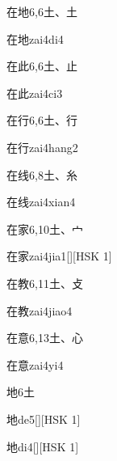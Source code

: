 \begin{entry}{在地}{6,6}{⼟、⼟}
  \begin{phonetics}{在地}{zai4di4}
  \end{phonetics}
\end{entry}

\begin{entry}{在此}{6,6}{⼟、⽌}
  \begin{phonetics}{在此}{zai4ci3}
  \end{phonetics}
\end{entry}

\begin{entry}{在行}{6,6}{⼟、⾏}
  \begin{phonetics}{在行}{zai4hang2}
  \end{phonetics}
\end{entry}

\begin{entry}{在线}{6,8}{⼟、⽷}
  \begin{phonetics}{在线}{zai4xian4}
  \end{phonetics}
\end{entry}

\begin{entry}{在家}{6,10}{⼟、⼧}
  \begin{phonetics}{在家}{zai4jia1}[][HSK 1]
  \end{phonetics}
\end{entry}

\begin{entry}{在教}{6,11}{⼟、⽁}
  \begin{phonetics}{在教}{zai4jiao4}
  \end{phonetics}
\end{entry}

\begin{entry}{在意}{6,13}{⼟、⼼}
  \begin{phonetics}{在意}{zai4yi4}
  \end{phonetics}
\end{entry}

\begin{entry}{地}{6}{⼟}
  \begin{phonetics}{地}{de5}[][HSK 1]
  \end{phonetics}
  \begin{phonetics}{地}{di4}[][HSK 1]
  \end{phonetics}
\end{entry}

